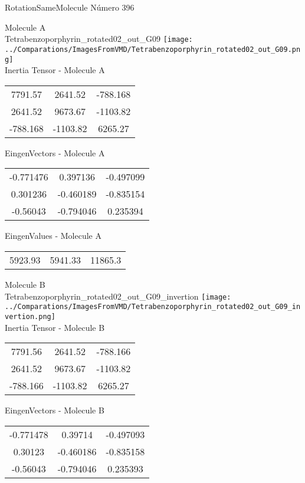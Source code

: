  \newpage

\vtab[-2cm]
\begin{center}
{\large RotationSameMolecule \tab Número 396}
\end{center}
\begin{multicols}{2}
\begin{center}

Molecule A \\ 
Tetrabenzoporphyrin\_rotated02\_out\_G09
\texttt{[image: ../Comparations/ImagesFromVMD/Tetrabenzoporphyrin\_rotated02\_out\_G09.png]}
\\
Inertia Tensor - Molecule A \\
\vtab

\begin{tabular}{|c c c|}
7791.57	 & 	2641.52	 & 	-788.168	 \\
2641.52	 & 	9673.67	 & 	-1103.82	 \\
-788.168	 & 	-1103.82	 & 	6265.27
\end{tabular}

\vtab
 EingenVectors - Molecule A     \\
\vtab
\begin{tabular}{|c c c|}
-0.771476	 & 	0.397136	 & 	-0.497099	 \\
0.301236	 & 	-0.460189	 & 	-0.835154	 \\
-0.56043	 & 	-0.794046	 & 	0.235394
\end{tabular}

\vtab
 EingenValues - Molecule A     \\
\vtab
\begin{tabular}{|c c c|}
5923.93	 & 	5941.33	 & 	11865.3	 \\
\end{tabular}
\columnbreak

Molecule B \\ 
Tetrabenzoporphyrin\_rotated02\_out\_G09\_invertion
\texttt{[image: ../Comparations/ImagesFromVMD/Tetrabenzoporphyrin\_rotated02\_out\_G09\_invertion.png]}
\\
Inertia Tensor - Molecule B \\
\vtab

\begin{tabular}{|c c c|}
7791.56	 & 	2641.52	 & 	-788.166	 \\
2641.52	 & 	9673.67	 & 	-1103.82	 \\
-788.166	 & 	-1103.82	 & 	6265.27
\end{tabular}

\vtab
 EingenVectors - Molecule B     \\
\vtab
\begin{tabular}{|c c c|}
-0.771478	 & 	0.39714	 & 	-0.497093	 \\
0.30123	 & 	-0.460186	 & 	-0.835158	 \\
-0.56043	 & 	-0.794046	 & 	0.235393
\end{tabular}


\end{center}
\end{multicols}
